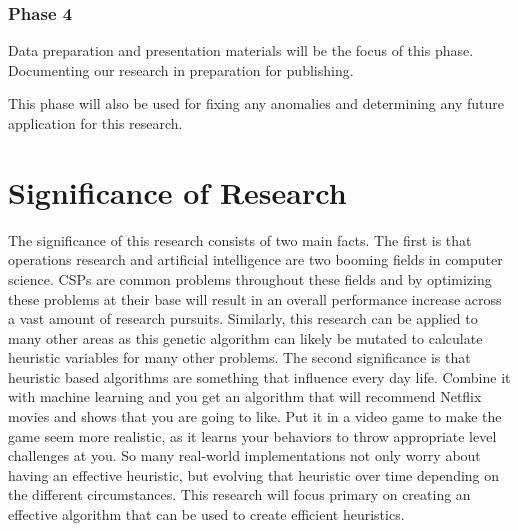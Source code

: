 \documentclass[10pt,twoside]{IEEEtran}
\begin{document}
\subsubsection{Phase 4}
Data preparation and presentation materials will be the focus of this phase. Documenting our research in preparation for publishing. 

This phase will also be used for fixing any anomalies and determining any future application for this research.

\section{Significance of Research}
The significance of this research consists of two main facts. The first is that operations research and artificial intelligence are two booming fields in computer science. CSPs are common problems throughout these fields and by optimizing these problems at their base will result in an overall performance increase across a vast amount of research pursuits. Similarly, this research can be applied to many other areas as this genetic algorithm can likely be mutated to calculate heuristic variables for many other problems. The second significance is that heuristic based algorithms are something that influence every day life. Combine it with machine learning and you get an algorithm that will recommend Netflix movies and shows that you are going to like. Put it in a video game to make the game seem more realistic, as it learns your behaviors to throw appropriate level challenges at you. So many real-world implementations not only worry about having an effective heuristic, but evolving that heuristic over time depending on the different circumstances. This research will focus primary on creating an effective algorithm that can be used to create efficient heuristics.

\nocite{*}


\end{document}
